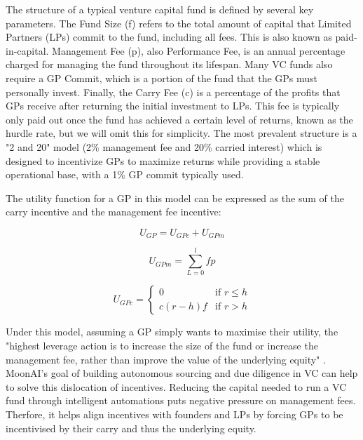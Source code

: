 \documentclass[a4paper, oneside]{discothesis}
\begin{document}
The structure of a typical venture capital fund is defined by several key parameters. The Fund Size (f) refers to the total amount of capital that Limited Partners (LPs) commit to the fund, including all fees. This is also known as paid-in-capital. Management Fee (p), also Performance Fee, is an annual percentage charged for managing the fund throughout its lifespan. Many VC funds also require a GP Commit, which is a portion of the fund that the GPs must personally invest. Finally, the Carry Fee (c) is a percentage of the profits that GPs receive after returning the initial investment to LPs. This fee is typically only paid out once the fund has achieved a certain level of returns, known as the hurdle rate, but we will omit this for simplicity. The most prevalent structure is a "2 and 20" model (2\% management fee and 20\% carried interest) which is designed to incentivize GPs to maximize returns while providing a stable operational base, with a 1\% GP commit typically used. 

The utility function for a GP in this model can be expressed as the sum of the carry incentive and the management fee incentive:

\begin{equation}
U_{GP} = U_{GPc} + U_{GPm}
\end{equation}

\begin{equation}
U_{GPm} = \sum_{L=0}^l fp
\end{equation}

\begin{equation}
U_{GPc} = \begin{cases}
    0 & \text{if } r \leq h \\
    c(r-h)f & \text{if } r > h
    \end{cases}
\end{equation}

Under this model, assuming a GP simply wants to maximise their utility, the "highest leverage action is to increase the size of the fund or increase the management fee, rather than improve the value of the underlying equity" \cite{Jafri_distributed_vc}. MoonAI's goal of building autonomous sourcing and due diligence in VC can help to solve this dislocation of incentives. Reducing the capital needed to run a VC fund through intelligent automations puts negative pressure on management fees. Therfore, it helps align incentives with founders and LPs by forcing GPs to be incentivised by their carry and thus the underlying equity. 
\end{document}
